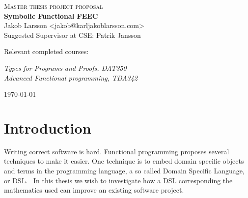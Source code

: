 \documentclass{scrartcl}
\begin{document}
\begin{titlepage}

\centering
{\scshape\LARGE Master thesis project proposal\\}
\vspace{0.5cm}
{\huge\bfseries Symbolic Functional FEEC\\}
\vspace{2cm}
{\Large Jakob Larsson <jakob@karljakoblarsson.com>\\}
\vspace{1.0cm}
{\large Suggested Supervisor at CSE: Patrik Jansson \\}
\vspace{1.5cm}
{\large Relevant completed courses:\par}
{\itshape
Types for Programs and Proofs, DAT350 \\
Advanced Functional programming, TDA342 \\
}

\vfill
{\large \today\\}
\end{titlepage}


%
%

\section{Introduction}


Writing correct software is hard.
Functional programming proposes several techniques to make it easier.
One technique is to embed domain specific objects and terms in the programming
language, a so called Domain Specific Language, or DSL.~\cite{van2000domain}
In this thesis we wish to investigate how a DSL
corresponding the mathematics used can improve an existing software project.
\end{document}
